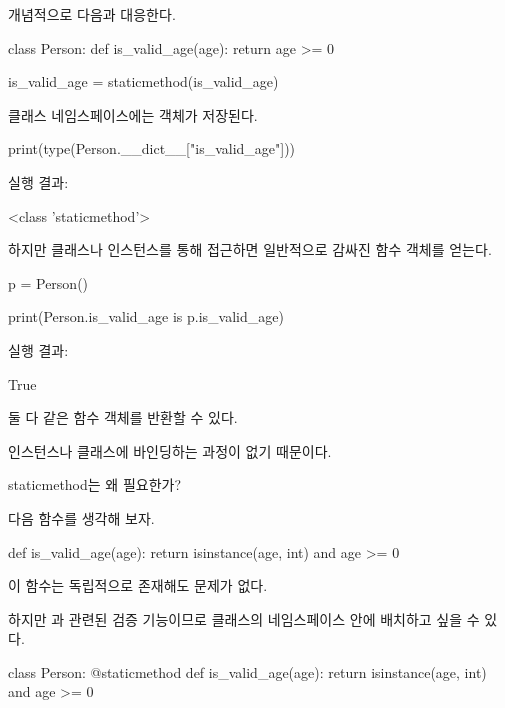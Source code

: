 개념적으로 다음과 대응한다.

\begin{dhkcode}
class Person:
    def is_valid_age(age):
        return age >= 0

    is_valid_age = staticmethod(is_valid_age)
\end{dhkcode}

클래스 네임스페이스에는  객체가 저장된다.

\begin{dhkcode}
print(type(Person.__dict__["is_valid_age"]))
\end{dhkcode}

실행 결과:

\begin{dhkzsh}
<class 'staticmethod'>
\end{dhkzsh}

하지만 클래스나 인스턴스를 통해 접근하면 일반적으로 감싸진 함수 객체를 얻는다.

\begin{dhkcode}
p = Person()

print(Person.is_valid_age is p.is_valid_age)
\end{dhkcode}

실행 결과:

\begin{dhkzsh}
True
\end{dhkzsh}

둘 다 같은 함수 객체를 반환할 수 있다.

인스턴스나 클래스에 바인딩하는 과정이 없기 때문이다.

\begin{dhknote}
\begin{dhksmry}[centered]
staticmethod는 왜 필요한가?
\end{dhksmry}
\end{dhknote}

다음 함수를 생각해 보자.

\begin{dhkcode}
def is_valid_age(age):
    return isinstance(age, int) and age >= 0
\end{dhkcode}

이 함수는 독립적으로 존재해도 문제가 없다.

하지만 과 관련된 검증 기능이므로 클래스의 네임스페이스 안에 배치하고 싶을 수 있다.

\begin{dhkcode}
class Person:
    @staticmethod
    def is_valid_age(age):
        return isinstance(age, int) and age >= 0
\end{dhkcode}

